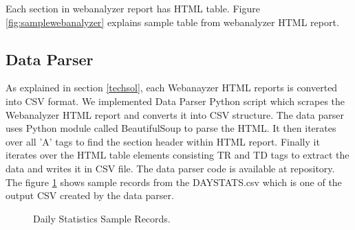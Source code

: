  Each section in webanalyzer report has HTML table. Figure
 \ref{fig:samplewebanalyzer} explains sample table from webanalyzer HTML
 report.


\subsection{Data Parser} \label{dataparser}
As explained in section \ref{techsol}, each Webanayzer HTML reports is
converted into CSV format. We implemented Data Parser Python script which
scrapes the
Webanalyzer HTML report and converts it into CSV structure. The data parser
uses Python module called BeautifulSoup to parse the HTML. It then iterates
over all 'A' tags to find the section header within HTML report. Finally it
iterates over the HTML table elements consisting TR and TD tags to extract
the data and writes it in CSV file.
 The data parser code is available at \cite{dataparser} repository. The
 figure \ref{fig:daystats} shows sample records from the DAYSTATS.csv which
 is one of the output CSV created by the data parser.

 \begin{figure}
\centering
{}
\caption{Daily Statistics Sample Records.}
\label{fig:daystats}
\end{figure}




